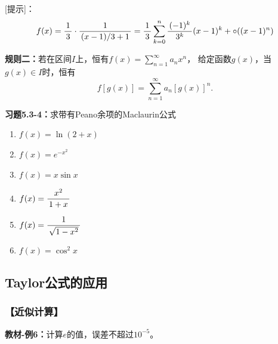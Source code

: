 [提示]：
$$f(x)=\displaystyle\frac{\,{1}\,}{\,{3}\,}\cdot\displaystyle\frac{\,{1}\,}{\,{(x-1)/3+1}\,}=\displaystyle\frac{\,{1}\,}{\,{3}\,}\sum\limits_{k=0}^n
\displaystyle\frac{\,{(-1)^k}\,}{\,{3^k}\,}(x-1)^{k}+\circ((x-1)^n)$$

{\bf 规则二：}若在区间$I$上，恒有$f(x)=\sum\limits_{n=1}^{\infty}a_nx^n$，
给定函数$g(x)$，当$g(x)\in I$时，恒有
$$f[g(x)]=\sum\limits_{n=1}^{\infty}a_n[g(x)]^n.$$

{\bf 习题5.3-4：}求带有Peano余项的Maclaurin公式
\begin{enumerate}[(1)]
  \setlength{\itemindent}{1cm}
  \item $f(x)=\ln(2+x)$ 
  \item $f(x)=e^{-x^2}$
  \item $f(x)=x\sin x$ 
  \item $f(x)=\displaystyle\frac{\,{x^2}\,}{\,{1+x}\,}$ 
  \item $f(x)=\displaystyle\frac{\,{1}\,}{\,{\sqrt{1-x^2}}\,}$ 
  \item $f(x)=\cos^2x$
\end{enumerate}

\subsection{Taylor公式的应用}

\subsubsection{【近似计算】}

{\bf 教材-例6：}计算$e$的值，误差不超过$10^{-5}$。

